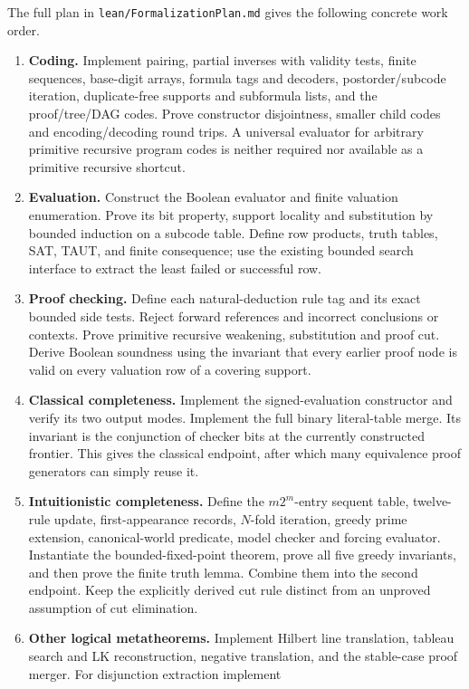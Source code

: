 The full plan in \texttt{lean/FormalizationPlan.md} gives the following
concrete work order.
\begin{enumerate}
\item \textbf{Coding.} Implement pairing, partial inverses with validity
tests, finite sequences, base-digit arrays, formula tags and decoders,
postorder/subcode iteration, duplicate-free supports and subformula lists,
and the proof/tree/DAG codes. Prove constructor disjointness, smaller
child codes and encoding/decoding round trips. A universal evaluator for
arbitrary primitive recursive program codes is neither required nor
available as a primitive recursive shortcut.
\item \textbf{Evaluation.} Construct the Boolean evaluator and finite
valuation enumeration. Prove its bit property, support locality and
substitution by bounded induction on a subcode table. Define row products,
truth tables, SAT, TAUT, and finite consequence; use the existing bounded
search interface to extract the least failed or successful row.
\item \textbf{Proof checking.} Define each natural-deduction rule tag
and its exact bounded side tests. Reject forward references and incorrect
conclusions or contexts. Prove primitive recursive weakening, substitution
and proof cut. Derive Boolean soundness using the invariant that every
earlier proof node is valid on every valuation row of a covering support.
\item \textbf{Classical completeness.} Implement the signed-evaluation
constructor and verify its two output modes. Implement the full binary
literal-table merge. Its invariant is the conjunction of checker bits at
the currently constructed frontier. This gives the classical endpoint,
after which many equivalence proof generators can simply reuse it.
\item \textbf{Intuitionistic completeness.} Define the $m2^m$-entry
sequent table, twelve-rule update, first-appearance records, $N$-fold
iteration, greedy prime extension, canonical-world predicate, model
checker and forcing evaluator. Instantiate the bounded-fixed-point
theorem, prove all five greedy invariants, and then prove the finite
truth lemma. Combine them into the second endpoint. Keep the explicitly
derived cut rule distinct from an unproved assumption of cut elimination.
\item \textbf{Other logical metatheorems.} Implement Hilbert line
translation, tableau search and LK reconstruction, negative translation,
and the stable-case proof merger. For disjunction extraction implement

\end{enumerate}

